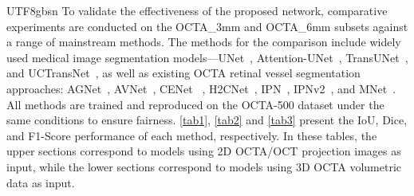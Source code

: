 \documentclass[times, review, 10pt]{elsarticle}
\begin{document}
\begin{CJK}{UTF8}{gbsn}
To validate the effectiveness of the proposed network, comparative experiments are conducted on the OCTA\_3mm and OCTA\_6mm subsets against a range of mainstream methods. The methods for the comparison include widely used medical image segmentation models—UNet~\cite{ref42}, Attention-UNet~\cite{ref43}, TransUNet~\cite{ref45}, and UCTransNet~\cite{ref49}, as well as existing OCTA retinal vessel segmentation approaches: AGNet~\cite{ref46}, AVNet~\cite{ref47}, CENet ~\cite{ref44}, H2CNet~\cite{ref13}, IPN~\cite{ref10}, IPNv2~\cite{ref5}, and MNet~\cite{ref48}. All methods are trained and reproduced on the OCTA-500 dataset under the same conditions to ensure fairness. \autoref{tab1}, \autoref{tab2} and \autoref{tab3} present the IoU, Dice, and F1-Score performance of each method, respectively. In these tables, the upper sections correspond to models using 2D OCTA/OCT projection images as input, while the lower sections correspond to models using 3D OCTA volumetric data as input.
\par


\end{CJK}
\end{document}
